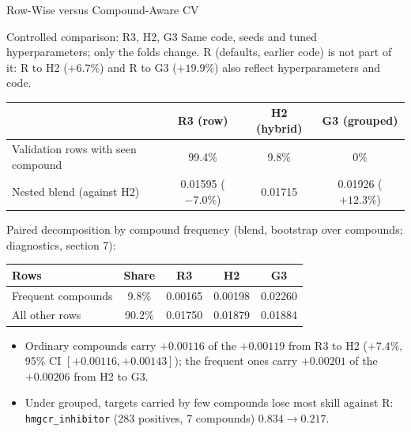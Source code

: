 \documentclass[aspectratio=169,10pt]{beamer}
\begin{document}
\begin{frame}{Row-Wise versus Compound-Aware CV}
\small
\begin{alertblock}{Controlled comparison: R3, H2, G3}
Same code, seeds and tuned hyperparameters; only the folds change. R (defaults, earlier code) is not part of it: R to H2 ($+6.7\%$) and R to G3 ($+19.9\%$) also reflect hyperparameters and code.
\end{alertblock}

\centering
\footnotesize
\begin{tabular}{lccc}
\toprule
 & \textbf{R3 (row)} & \textbf{H2 (hybrid)} & \textbf{G3 (grouped)}\\
\midrule
Validation rows with seen compound & 99.4\% & 9.8\% & 0\%\\
Nested blend (against H2) & 0.01595 ($-7.0\%$) & 0.01715 & 0.01926 ($+12.3\%$)\\
\bottomrule
\end{tabular}

\vspace{0.3em}
Paired decomposition by compound frequency (blend, bootstrap over compounds; diagnostics, section 7):
\vspace{0.1em}

\begin{tabular}{lcccc}
\toprule
\textbf{Rows} & \textbf{Share} & \textbf{R3} & \textbf{H2} & \textbf{G3}\\
\midrule
Frequent compounds & 9.8\% & 0.00165 & 0.00198 & 0.02260\\
All other rows & 90.2\% & 0.01750 & 0.01879 & 0.01884\\
\bottomrule
\end{tabular}

\vspace{0.2em}
\raggedright
\small
\begin{itemize}
  \item Ordinary compounds carry $+0.00116$ of the $+0.00119$ from R3 to H2 ($+7.4\%$, 95\% CI $[+0.00116,+0.00143]$); the frequent ones carry $+0.00201$ of the $+0.00206$ from H2 to G3.
  \item Under grouped, targets carried by few compounds lose most skill against R: \texttt{hmgcr\_inhibitor} (283 positives, 7 compounds) $0.834\to0.217$.
\end{itemize}
\end{frame}
\end{document}
